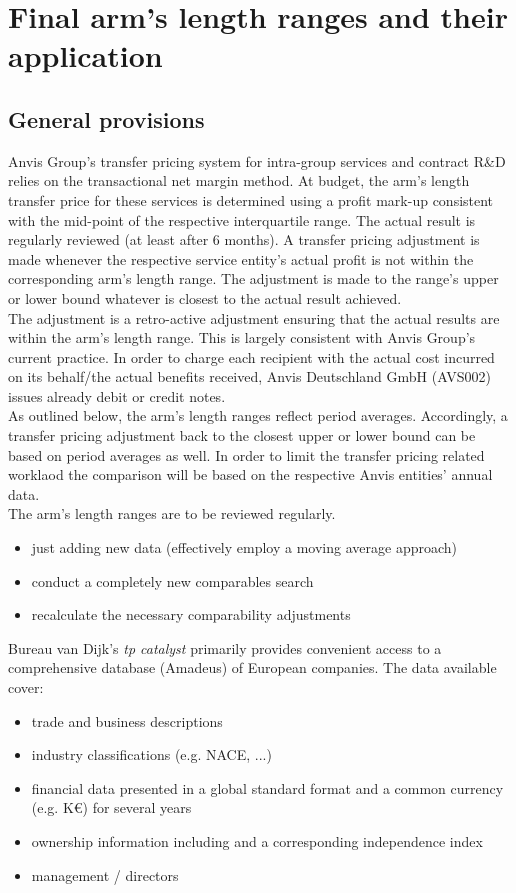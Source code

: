 \documentclass[12pt]{article}
\begin{document}
\pagestyle{fancy}

\rfoot{\footnotesize \thepage}
\section{Final arm's length ranges and their application}
\subsection{General provisions}
Anvis Group's transfer pricing system for intra-group services and contract R\&D relies on the transactional net margin method. At budget, the arm's length transfer price for these services is determined using a profit mark-up consistent with the mid-point of the respective interquartile range. The actual result is regularly reviewed (at least after 6 months). A transfer pricing adjustment is made whenever the respective service entity's actual profit is not within the corresponding arm's length range. The adjustment is made to the range's upper or lower bound whatever is closest to the actual result achieved.\\[0.2cm]
The adjustment is a retro-active adjustment ensuring that the actual results are within the arm's length range. This is largely consistent with Anvis Group's current practice. In order to charge each recipient with the actual cost incurred on its behalf/the actual benefits received, Anvis Deutschland GmbH (AVS002) issues already debit or credit notes.\\[0.2cm]
As outlined below, the arm's length ranges reflect period averages. Accordingly, a transfer pricing adjustment back to the closest upper or lower bound can be based on period averages as well. In order to limit the transfer pricing related worklaod the comparison will be based on the respective Anvis entities' annual data.\\[0.2cm]
The arm's length ranges are to be reviewed regularly.\begin{itemize}
  \item just adding new data (effectively employ a moving average approach)
  \item conduct a completely new comparables search
  \item recalculate the necessary comparability adjustments
\end{itemize}
Bureau van Dijk's \emph{tp catalyst} primarily provides convenient access to a comprehensive database (Amadeus) of European companies. The data available cover: \begin{itemize}
  \item trade and business descriptions
  \item industry classifications (e.g. NACE, ...)
  \item financial data presented in a global standard format and a common currency (e.g. K\euro) for several years
  \item ownership information including and a corresponding independence index
  \item management / directors
\end{itemize}
\end{document}
